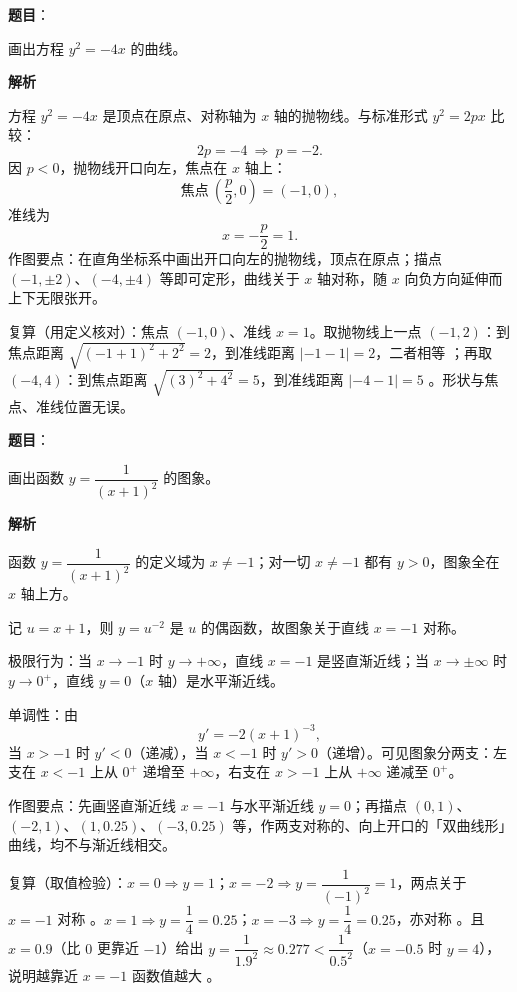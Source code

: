 \begin{answer}

\textbf{题目}：

画出方程 $y^2=-4x$ 的曲线。

\textbf{解析}

方程 $y^2=-4x$ 是顶点在原点、对称轴为 $x$ 轴的抛物线。与标准形式 $y^2=2px$ 比较：
\nopagebreak[4]
\[
2p=-4\ \Longrightarrow\ p=-2.
\]
因 $p<0$，抛物线开口向左，焦点在 $x$ 轴上：
\nopagebreak[4]
\[
\text{焦点}\ \left(\frac p2,0\right)=(-1,0),
\]
准线为
\nopagebreak[4]
\[
x=-\frac p2=1.
\]
作图要点：在直角坐标系中画出开口向左的抛物线，顶点在原点；描点 $(-1,\pm2)$、$(-4,\pm4)$ 等即可定形，曲线关于 $x$ 轴对称，随 $x$ 向负方向延伸而上下无限张开。

复算（用定义核对）：焦点 $(-1,0)$、准线 $x=1$。取抛物线上一点 $(-1,2)$：到焦点距离 $\sqrt{(-1+1)^2+2^2}=2$，到准线距离 $|{-1}-1|=2$，二者相等 ；再取 $(-4,4)$：到焦点距离 $\sqrt{(3)^2+4^2}=5$，到准线距离 $|{-4}-1|=5$ 。形状与焦点、准线位置无误。


\end{answer}
\begin{answer}

\textbf{题目}：

画出函数 $y=\dfrac{1}{(x+1)^2}$ 的图象。

\textbf{解析}

函数 $y=\dfrac1{(x+1)^2}$ 的定义域为 $x\ne-1$；对一切 $x\ne-1$ 都有 $y>0$，图象全在 $x$ 轴上方。

记 $u=x+1$，则 $y=u^{-2}$ 是 $u$ 的偶函数，故图象关于直线 $x=-1$ 对称。

极限行为：当 $x\to-1$ 时 $y\to+\infty$，直线 $x=-1$ 是竖直渐近线；当 $x\to\pm\infty$ 时 $y\to0^{+}$，直线 $y=0$（$x$ 轴）是水平渐近线。

单调性：由
\nopagebreak[4]
\[
y'=-2(x+1)^{-3},
\]
当 $x>-1$ 时 $y'<0$（递减），当 $x<-1$ 时 $y'>0$（递增）。可见图象分两支：左支在 $x<-1$ 上从 $0^{+}$ 递增至 $+\infty$，右支在 $x>-1$ 上从 $+\infty$ 递减至 $0^{+}$。

作图要点：先画竖直渐近线 $x=-1$ 与水平渐近线 $y=0$；再描点 $(0,1)$、$(-2,1)$、$(1,0.25)$、$(-3,0.25)$ 等，作两支对称的、向上开口的「双曲线形」曲线，均不与渐近线相交。

复算（取值检验）：$x=0\Rightarrow y=1$；$x=-2\Rightarrow y=\dfrac1{(-1)^2}=1$，两点关于 $x=-1$ 对称 。$x=1\Rightarrow y=\dfrac14=0.25$；$x=-3\Rightarrow y=\dfrac14=0.25$，亦对称 。且 $x=0.9$（比 $0$ 更靠近 $-1$）给出 $y=\dfrac1{1.9^2}\approx0.277<\dfrac{1}{0.5^2}$（$x=-0.5$ 时 $y=4$），说明越靠近 $x=-1$ 函数值越大 。


\end{answer}
